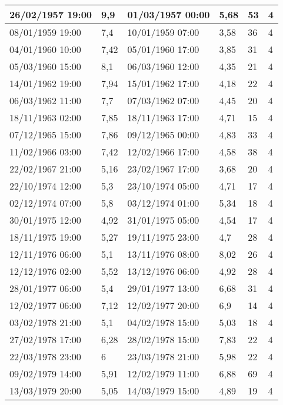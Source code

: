 \documentclass[11pt]{article}
\begin{document}
\begin{longtable}{|l|p{2.3cm}|l|p{2.3cm}|l|l|}
        26/02/1957 19:00 & 9,9 & 01/03/1957 00:00 & 5,68 & 53 & 4 \\ \hline
        08/01/1959 19:00 & 7,4 & 10/01/1959 07:00 & 3,58 & 36 & 4 \\ \hline
        04/01/1960 10:00 & 7,42 & 05/01/1960 17:00 & 3,85 & 31 & 4 \\ \hline
        05/03/1960 15:00 & 8,1 & 06/03/1960 12:00 & 4,35 & 21 & 4 \\ \hline
        14/01/1962 19:00 & 7,94 & 15/01/1962 17:00 & 4,18 & 22 & 4 \\ \hline
        06/03/1962 11:00 & 7,7 & 07/03/1962 07:00 & 4,45 & 20 & 4 \\ \hline
        18/11/1963 02:00 & 7,85 & 18/11/1963 17:00 & 4,71 & 15 & 4 \\ \hline
        07/12/1965 15:00 & 7,86 & 09/12/1965 00:00 & 4,83 & 33 & 4 \\ \hline
        11/02/1966 03:00 & 7,42 & 12/02/1966 17:00 & 4,58 & 38 & 4 \\ \hline
        22/02/1967 21:00 & 5,16 & 23/02/1967 17:00 & 3,68 & 20 & 4 \\ \hline
        22/10/1974 12:00 & 5,3 & 23/10/1974 05:00 & 4,71 & 17 & 4 \\ \hline
        02/12/1974 07:00 & 5,8 & 03/12/1974 01:00 & 5,34 & 18 & 4 \\ \hline
        30/01/1975 12:00 & 4,92 & 31/01/1975 05:00 & 4,54 & 17 & 4 \\ \hline
        18/11/1975 19:00 & 5,27 & 19/11/1975 23:00 & 4,7 & 28 & 4 \\ \hline
        12/11/1976 06:00 & 5,1 & 13/11/1976 08:00 & 8,02 & 26 & 4 \\ \hline
        12/12/1976 02:00 & 5,52 & 13/12/1976 06:00 & 4,92 & 28 & 4 \\ \hline
        28/01/1977 06:00 & 5,4 & 29/01/1977 13:00 & 6,68 & 31 & 4 \\ \hline
        12/02/1977 06:00 & 7,12 & 12/02/1977 20:00 & 6,9 & 14 & 4 \\ \hline
        03/02/1978 21:00 & 5,1 & 04/02/1978 15:00 & 5,03 & 18 & 4 \\ \hline
        27/02/1978 17:00 & 6,28 & 28/02/1978 15:00 & 7,83 & 22 & 4 \\ \hline
        22/03/1978 23:00 & 6 & 23/03/1978 21:00 & 5,98 & 22 & 4 \\ \hline
        09/02/1979 14:00 & 5,91 & 12/02/1979 11:00 & 6,88 & 69 & 4 \\ \hline
        13/03/1979 20:00 & 5,05 & 14/03/1979 15:00 & 4,89 & 19 & 4 \\ \hline

\end{longtable}
\end{document}
